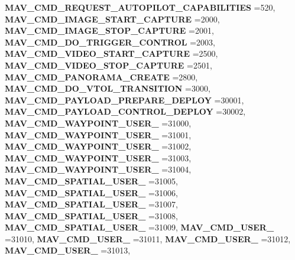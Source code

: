 \begin{DoxyCompactItemize}
\textbf{ M\+A\+V\+\_\+\+C\+M\+D\+\_\+\+R\+E\+Q\+U\+E\+S\+T\+\_\+\+A\+U\+T\+O\+P\+I\+L\+O\+T\+\_\+\+C\+A\+P\+A\+B\+I\+L\+I\+T\+I\+ES} =520, 
\textbf{ M\+A\+V\+\_\+\+C\+M\+D\+\_\+\+I\+M\+A\+G\+E\+\_\+\+S\+T\+A\+R\+T\+\_\+\+C\+A\+P\+T\+U\+RE} =2000, 
\newline
\textbf{ M\+A\+V\+\_\+\+C\+M\+D\+\_\+\+I\+M\+A\+G\+E\+\_\+\+S\+T\+O\+P\+\_\+\+C\+A\+P\+T\+U\+RE} =2001, 
\textbf{ M\+A\+V\+\_\+\+C\+M\+D\+\_\+\+D\+O\+\_\+\+T\+R\+I\+G\+G\+E\+R\+\_\+\+C\+O\+N\+T\+R\+OL} =2003, 
\textbf{ M\+A\+V\+\_\+\+C\+M\+D\+\_\+\+V\+I\+D\+E\+O\+\_\+\+S\+T\+A\+R\+T\+\_\+\+C\+A\+P\+T\+U\+RE} =2500, 
\textbf{ M\+A\+V\+\_\+\+C\+M\+D\+\_\+\+V\+I\+D\+E\+O\+\_\+\+S\+T\+O\+P\+\_\+\+C\+A\+P\+T\+U\+RE} =2501, 
\newline
\textbf{ M\+A\+V\+\_\+\+C\+M\+D\+\_\+\+P\+A\+N\+O\+R\+A\+M\+A\+\_\+\+C\+R\+E\+A\+TE} =2800, 
\textbf{ M\+A\+V\+\_\+\+C\+M\+D\+\_\+\+D\+O\+\_\+\+V\+T\+O\+L\+\_\+\+T\+R\+A\+N\+S\+I\+T\+I\+ON} =3000, 
\textbf{ M\+A\+V\+\_\+\+C\+M\+D\+\_\+\+P\+A\+Y\+L\+O\+A\+D\+\_\+\+P\+R\+E\+P\+A\+R\+E\+\_\+\+D\+E\+P\+L\+OY} =30001, 
\textbf{ M\+A\+V\+\_\+\+C\+M\+D\+\_\+\+P\+A\+Y\+L\+O\+A\+D\+\_\+\+C\+O\+N\+T\+R\+O\+L\+\_\+\+D\+E\+P\+L\+OY} =30002, 
\newline
\textbf{ M\+A\+V\+\_\+\+C\+M\+D\+\_\+\+W\+A\+Y\+P\+O\+I\+N\+T\+\_\+\+U\+S\+E\+R\+\_} =31000, 
\textbf{ M\+A\+V\+\_\+\+C\+M\+D\+\_\+\+W\+A\+Y\+P\+O\+I\+N\+T\+\_\+\+U\+S\+E\+R\+\_} =31001, 
\textbf{ M\+A\+V\+\_\+\+C\+M\+D\+\_\+\+W\+A\+Y\+P\+O\+I\+N\+T\+\_\+\+U\+S\+E\+R\+\_} =31002, 
\textbf{ M\+A\+V\+\_\+\+C\+M\+D\+\_\+\+W\+A\+Y\+P\+O\+I\+N\+T\+\_\+\+U\+S\+E\+R\+\_} =31003, 
\newline
\textbf{ M\+A\+V\+\_\+\+C\+M\+D\+\_\+\+W\+A\+Y\+P\+O\+I\+N\+T\+\_\+\+U\+S\+E\+R\+\_} =31004, 
\textbf{ M\+A\+V\+\_\+\+C\+M\+D\+\_\+\+S\+P\+A\+T\+I\+A\+L\+\_\+\+U\+S\+E\+R\+\_} =31005, 
\textbf{ M\+A\+V\+\_\+\+C\+M\+D\+\_\+\+S\+P\+A\+T\+I\+A\+L\+\_\+\+U\+S\+E\+R\+\_} =31006, 
\textbf{ M\+A\+V\+\_\+\+C\+M\+D\+\_\+\+S\+P\+A\+T\+I\+A\+L\+\_\+\+U\+S\+E\+R\+\_} =31007, 
\newline
\textbf{ M\+A\+V\+\_\+\+C\+M\+D\+\_\+\+S\+P\+A\+T\+I\+A\+L\+\_\+\+U\+S\+E\+R\+\_} =31008, 
\textbf{ M\+A\+V\+\_\+\+C\+M\+D\+\_\+\+S\+P\+A\+T\+I\+A\+L\+\_\+\+U\+S\+E\+R\+\_} =31009, 
\textbf{ M\+A\+V\+\_\+\+C\+M\+D\+\_\+\+U\+S\+E\+R\+\_} =31010, 
\textbf{ M\+A\+V\+\_\+\+C\+M\+D\+\_\+\+U\+S\+E\+R\+\_} =31011, 
\newline
\textbf{ M\+A\+V\+\_\+\+C\+M\+D\+\_\+\+U\+S\+E\+R\+\_} =31012, 
\textbf{ M\+A\+V\+\_\+\+C\+M\+D\+\_\+\+U\+S\+E\+R\+\_} =31013, 

\end{DoxyCompactItemize}
